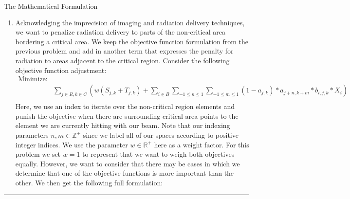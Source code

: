 \documentclass[12pt]{article}
\makeatletter
\newenvironment{task}{\@startsection
       {section}{1}
       {0.4em}{-.5ex plus -1ex minus -.2ex}{.5ex plus .2ex}
       {\pagebreak[3]\large\bf\noindent{Task}}}
       {\nopagebreak[3]\vspace{3ex}\begin{center}\rule{1\linewidth}{.3pt}\end{center}}
\makeatother
\begin{document}
\begin{task}{The Mathematical Formulation}
\begin{enumerate}
Our new constraints will establish the slack for both limits, allowing the bounds to vary depending on the amount of slack needed to achieve a feasible solution. These slack variables have to be non-negative, and thus for the lower limit we subtract the slack variable (analogous to allowing a lower bound) and for the upper limit we add the slack variable (analogous to allowing a higher bound). 

For quick intuition on the non-negativity constraint, we can note that were $T_{j,k}$ allowed to be less than 0, for example, we would consider cases where we increased the lower bound on tumor radiation. Since the current bound is infeasible, any higher bound that just further restricts the choice set of beam intensities must also be infeasible. Thus we only consider non-negativity. 

\item Acknowledging the imprecision of imaging and radiation delivery techniques, we want to penalize radiation delivery to parts of the non-critical area bordering a critical area. We keep the objective function formulation from the previous problem and add in another term that expresses the penalty for radiation to areas adjacent to the critical region. Consider the following objective function adjustment:
\begin{eqnarray*} 
\textrm{Minimize:} \\
& \sum_{j \in R, k \in C} (w(S_{j,k} + T_{j,k}) + \sum_{i \in B} \sum_{-1 \leq n \leq 1} \sum_{-1 \leq m \leq 1} (1-a_{j,k}) * a_{j+n, k+m} * b_{i,j,k} * X_{i})\\ 
\end{eqnarray*}
Here, we use an index to iterate over the non-critical region elements and punish the objective when there are surrounding critical area points to the element we are currently hitting with our beam. Note that our indexing parameters $n,m \in \mathbb{Z}^+$ since we label all of our spaces according to positive integer indices. We use the parameter $w \in \mathbb{R}^+$ here as a weight factor. For this problem we set $w=1$ to represent that we want to weigh both objectives equally. However, we want to consider that there may be cases in which we determine that one of the objective functions is more important than the other. We then get the following full formulation:


\end{enumerate}
\end{task}
\end{document}
